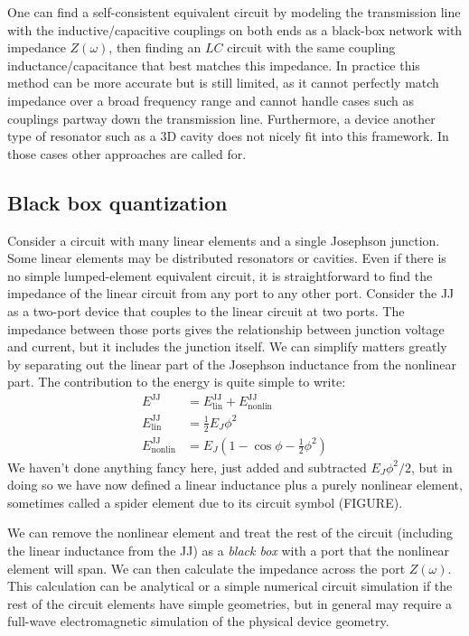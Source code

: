 One can find a self-consistent equivalent circuit by modeling the transmission line with the inductive/capacitive couplings on both ends as a black-box network with impedance $Z(\omega)$, then finding an $LC$ circuit with the same coupling inductance/capacitance that best matches this impedance. In practice this method can be more accurate but is still limited, as it cannot perfectly match impedance over a broad frequency range and cannot handle cases such as couplings partway down the transmission line. Furthermore, a device another type of resonator such as a 3D cavity does not nicely fit into this framework. In those cases other approaches are called for.

\subsection{Black box quantization}
\label{sec:blackbox}
Consider a circuit with many linear elements and a single Josephson junction. Some linear elements may be distributed resonators or cavities. Even if there is no simple lumped-element equivalent circuit, it is straightforward to find the impedance of the linear circuit from any port to any other port. Consider the JJ as a two-port device that couples to the linear circuit at two ports. The impedance between those ports gives the relationship between junction voltage and current, but it includes the junction itself. We can simplify matters greatly by separating out the linear part of the Josephson inductance from the nonlinear part. The contribution to the energy is quite simple to write:
\begin{align}
	E^\mathrm{JJ} &= E^\mathrm{JJ}_\mathrm{lin} + E^\mathrm{JJ}_\mathrm{nonlin} \\
	E^\mathrm{JJ}_\mathrm{lin} &= \frac{1}{2}E_J \phi^2 \\
	E^\mathrm{JJ}_\mathrm{nonlin} &= E_J (1 - \cos\phi - \frac{1}{2}\phi^2)	\label{eq:JJnonlin}
\end{align}
We haven't done anything fancy here, just added and subtracted $E_J \phi^2/2$, but in doing so we have now defined a linear inductance plus a purely nonlinear element, sometimes called a spider element due to its circuit symbol (FIGURE).

We can remove the nonlinear element and treat the rest of the circuit (including the linear inductance from the JJ) as a \textit{black box} with a port that the nonlinear element will span. We can then calculate the impedance across the port $Z(\omega)$. This calculation can be analytical or a simple numerical circuit simulation if the rest of the circuit elements have simple geometries, but in general may require a full-wave electromagnetic simulation of the physical device geometry. 

